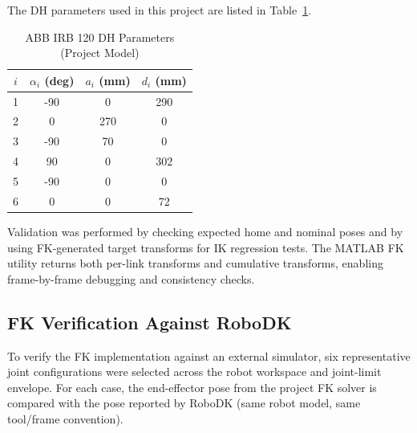\documentclass[conference]{IEEEtran}
\begin{document}
The DH parameters used in this project are listed in Table~\ref{tab:dh}.
\begin{table}[htbp]
\caption{ABB IRB 120 DH Parameters (Project Model)}
\label{tab:dh}
\centering
\begin{tabular}{c c c c}
\toprule
$i$ & $\alpha_i$ (deg) & $a_i$ (mm) & $d_i$ (mm) \\
\midrule
1 & -90 & 0   & 290 \\
2 & 0   & 270 & 0   \\
3 & -90 & 70  & 0   \\
4 & 90  & 0   & 302 \\
5 & -90 & 0   & 0   \\
6 & 0   & 0   & 72  \\
\bottomrule
\end{tabular}
\end{table}

Validation was performed by checking expected home and nominal poses and by using FK-generated target transforms for IK regression tests. The MATLAB FK utility returns both per-link transforms and cumulative transforms, enabling frame-by-frame debugging and consistency checks.

\subsection{FK Verification Against RoboDK}
To verify the FK implementation against an external simulator, six representative joint configurations were selected across the robot workspace and joint-limit envelope. For each case, the end-effector pose from the project FK solver is compared with the pose reported by RoboDK (same robot model, same tool/frame convention).
\end{document}
